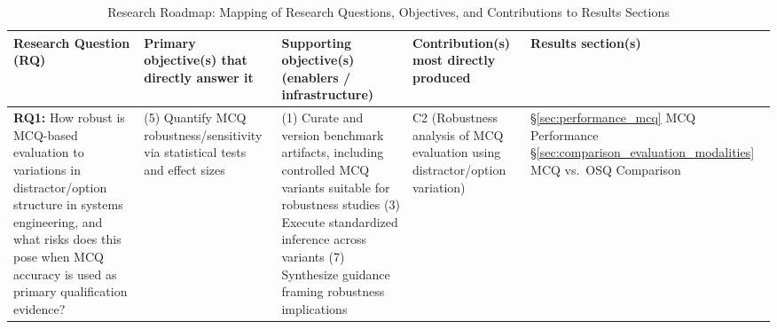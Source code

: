 
\begin{landscape}
\begin{table}[htbp]
\centering
\caption{Research Roadmap: Mapping of Research Questions, Objectives, and Contributions to Results Sections}
\label{tab:rq_obj_results_roadmap}

\small
\setlength{\tabcolsep}{4pt}
\renewcommand{\arraystretch}{1.25}

\begin{tabularx}{\linewidth}{p{2.8cm} X X p{2.6cm} p{3.6cm}}
\toprule
\textbf{Research Question (RQ)} &
\textbf{Primary objective(s) that directly answer it} &
\textbf{Supporting objective(s) (enablers / infrastructure)} &
\textbf{Contribution(s) most directly produced} &
\textbf{Results section(s)} \\
\midrule

\textbf{RQ1:} How robust is MCQ-based evaluation to variations in distractor/option structure in systems engineering, and what risks does this pose when MCQ accuracy is used as primary qualification evidence? &
(5) Quantify MCQ robustness/sensitivity via statistical tests and effect sizes &
(1) Curate and version benchmark artifacts, including controlled MCQ variants suitable for robustness studies\newline
(3) Execute standardized inference across variants\newline
(7) Synthesize guidance framing robustness implications &
C2 (Robustness analysis of MCQ evaluation using distractor/option variation) &
\S\ref{sec:performance_mcq} MCQ Performance\newline
\S\ref{sec:comparison_evaluation_modalities} MCQ vs.\ OSQ Comparison \\
\midrule


\end{tabularx}
\end{table}
\end{landscape}
